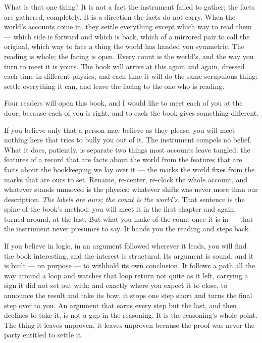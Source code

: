 What is that one thing? It is not a fact the instrument failed to gather; the facts are gathered, completely.
It is a direction the facts do not carry. When the world's accounts come in, they settle everything except
which way to read them --- which side is forward and which is back, which of a mirrored pair to call the
original, which way to face a thing the world has handed you symmetric. The reading is whole; the facing is
open. Every count is the world's, and the way you turn to meet it is yours. The book will arrive at this again
and again, dressed each time in different physics, and each time it will do the same scrupulous thing: settle
everything it can, and leave the facing to the one who is reading.

Four readers will open this book, and I would like to meet each of you at the door, because each of you is
right, and to each the book gives something different.

If you believe only that a person may believe as they please, you will meet nothing here that tries to bully
you out of it. The instrument compels no belief. What it does, patiently, is separate two things most accounts
leave tangled: the features of a record that are facts about the world from the features that are facts about
the bookkeeping we lay over it --- the marks the world fixes from the marks that are ours to set. Rename,
re-center, re-clock the whole account, and whatever stands unmoved is the physics; whatever shifts was never
more than our description. \emph{The labels are ours; the count is the world's.} That sentence is the spine of
the book's method; you will meet it in the first chapter and again, turned around, at the last. But what you
make of the count once it is in --- that the instrument never presumes to say. It hands you the reading and
steps back.

If you believe in logic, in an argument followed wherever it leads, you will find the book interesting, and
the interest is structural. Its argument is sound, and it is built --- on purpose --- to withhold its own
conclusion. It follows a path all the way around a loop and watches that loop return not quite as it left,
carrying a sign it did not set out with; and exactly where you expect it to close, to announce the result and
take its bow, it stops one step short and turns the final step over to you. An argument that earns every step
but the last, and then declines to take it, is not a gap in the reasoning. It is the reasoning's whole point.
The thing it leaves unproven, it leaves unproven because the proof was never the party entitled to settle it.

